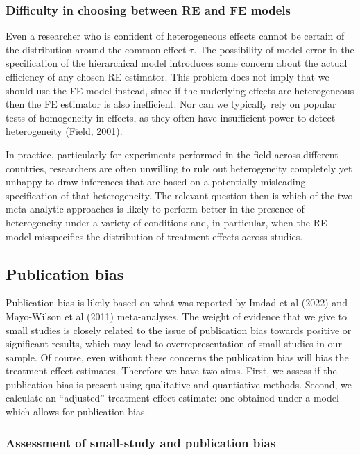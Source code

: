 \documentclass[12pt]{article}
\begin{document}
\subsubsection*{Difficulty in choosing between RE and FE models}

Even a researcher who is confident of heterogeneous effects cannot be certain of the distribution around the common effect $\tau$. The possibility of model error in the specification of the hierarchical model introduces some concern about the actual efficiency of any chosen RE estimator. This problem does not imply that we should use the FE model instead, since if the underlying effects are heterogeneous then the FE estimator is also inefficient. Nor can we typically rely on popular tests of homogeneity in effects, as they often have insufficient power to detect heterogeneity (Field, 2001). 

In practice, particularly for experiments performed in the field across different countries, researchers are often unwilling to rule out heterogeneity completely yet unhappy to draw inferences that are based on a potentially misleading specification of that heterogeneity. The relevant question then is which of the two meta-analytic approaches is likely to perform better in the presence of heterogeneity under a variety of conditions and, in particular, when the RE model misspecifies the distribution of treatment effects across studies.



\subsection{Publication bias}

Publication bias is likely based on what was reported by Imdad et al (2022) and Mayo-Wilson et al (2011) meta-analyses. The weight of evidence that we give to small studies is closely related to the issue of publication bias towards positive or significant results, which may lead to overrepresentation of small studies in our sample. Of course, even without these concerns the publication bias will bias the treatment effect estimates. Therefore we have two aims. First, we assess if the publication bias is present using qualitative and quantiative methods. Second, we calculate an ``adjusted'' treatment effect estimate: one obtained under a model which allows for publication bias.

\subsubsection{Assessment of small‐study and publication bias}
\end{document}
